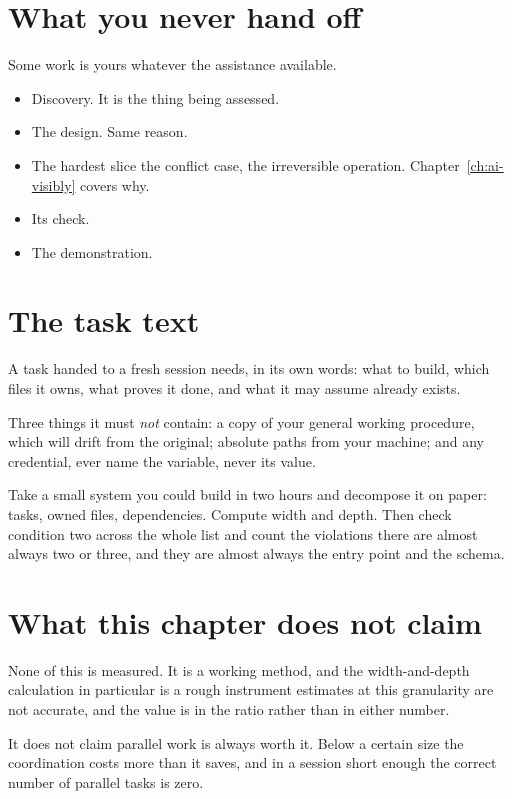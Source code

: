 \section{What you never hand off}

Some work is yours whatever the assistance available.

\begin{itemize}
  \item Discovery. It is the thing being assessed.
  \item The design. Same reason.
  \item The hardest slice \dash{} the conflict case, the irreversible
        operation. Chapter~\ref{ch:ai-visibly} covers why.
  \item Its check.
  \item The demonstration.
\end{itemize}


\section{The task text}

A task handed to a fresh session needs, in its own words: what to build, which
files it owns, what proves it done, and what it may assume already exists.

Three things it must \emph{not} contain: a copy of your general working
procedure, which will drift from the original; absolute paths from your
machine; and any credential, ever \dash{} name the variable, never its value.

\begin{drill}
Take a small system you could build in two hours and decompose it on paper:
tasks, owned files, dependencies. Compute width and depth. Then check condition
two across the whole list and count the violations \dash{} there are almost
always two or three, and they are almost always the entry point and the schema.
\end{drill}

\section*{What this chapter does not claim}

None of this is measured. It is a working method, and the width-and-depth
calculation in particular is a rough instrument \dash{} estimates at this
granularity are not accurate, and the value is in the ratio rather than in
either number.

It does not claim parallel work is always worth it. Below a certain size the
coordination costs more than it saves, and in a session short enough the
correct number of parallel tasks is zero.
